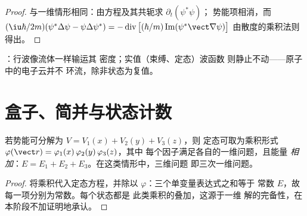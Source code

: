 \begin{proof}
与一维情形相同：由方程及其共轭求 $\partial_t(\psi^*\psi)$；
势能项相消，而 $(\iu\hbar/2m)
(\psi^*\Delta\psi - \psi\Delta\psi^*) =
-\operatorname{div}\big[(\hbar/m)\operatorname{Im}(\psi^*\vect\nabla
\psi)\big]$ 由散度的乘积法则得出。
\end{proof}

\begin{omfigure}

{\small {}：行波像流体一样输运其
密度；实值（束缚、定态）波函数
则静止不动——原子中的电子云并不
环流，除非状态为复值。}
\end{omfigure}

\section{盒子、简并与状态计数}

\begin{theorem}[分离变量法]\label{thm:b3:schrodinger-three-dimensions:separation}
若势能可分解为 $V = V_1(x) + V_2(y) + V_3(z)$，则
定态可取为乘积形式
$\varphi(\vect r) = \varphi_1(x)\,\varphi_2(y)\,\varphi_3(z)$，其中
每个因子满足各自的一维问题，且能量
\emph{相加}：$E = E_1 + E_2 + E_3$。在这类情形中，三维问题
即三次一维问题。
\end{theorem}

\begin{proof}
将乘积代入定态方程，并除以
$\varphi$：三个单变量表达式之和等于
常数 $E$，故每一项分别为常数。每个状态都是
此类乘积的叠加，这源于一维
解的完备性，在本阶段不加证明地承认。
\end{proof}

